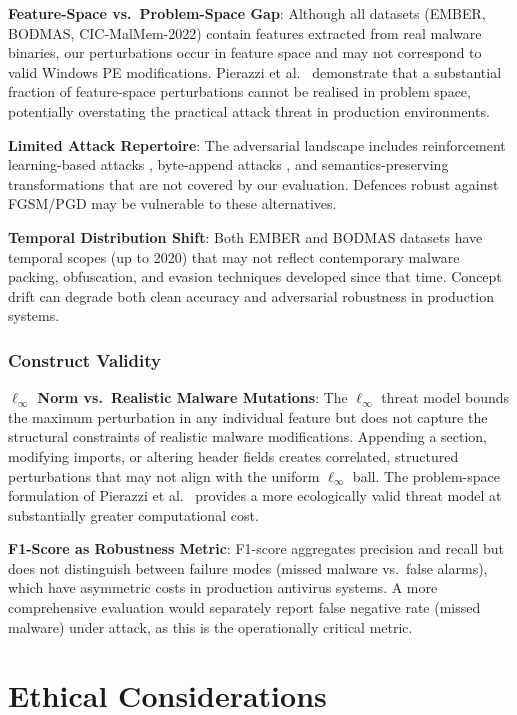\documentclass[conference]{IEEEtran}
\begin{document}
\textbf{Feature-Space vs.\ Problem-Space Gap}: Although all datasets (EMBER, BODMAS, CIC-MalMem-2022) contain features extracted from real malware binaries, our perturbations occur in feature space and may not correspond to valid Windows PE modifications. Pierazzi et al.\ \cite{pierazzi2020} demonstrate that a substantial fraction of feature-space perturbations cannot be realised in problem space, potentially overstating the practical attack threat in production environments.

\textbf{Limited Attack Repertoire}: The adversarial landscape includes reinforcement learning-based attacks \cite{anderson2018}, byte-append attacks \cite{raff2020}, and semantics-preserving transformations that are not covered by our evaluation. Defences robust against FGSM/PGD may be vulnerable to these alternatives.

\textbf{Temporal Distribution Shift}: Both EMBER and BODMAS datasets have temporal scopes (up to 2020) that may not reflect contemporary malware packing, obfuscation, and evasion techniques developed since that time. Concept drift can degrade both clean accuracy and adversarial robustness in production systems.

\subsubsection{Construct Validity}

\textbf{$\ell_\infty$ Norm vs.\ Realistic Malware Mutations}: The $\ell_\infty$ threat model bounds the maximum perturbation in any individual feature but does not capture the structural constraints of realistic malware modifications. Appending a section, modifying imports, or altering header fields creates correlated, structured perturbations that may not align with the uniform $\ell_\infty$ ball. The problem-space formulation of Pierazzi et al.\ \cite{pierazzi2020} provides a more ecologically valid threat model at substantially greater computational cost.

\textbf{F1-Score as Robustness Metric}: F1-score aggregates precision and recall but does not distinguish between failure modes (missed malware vs.\ false alarms), which have asymmetric costs in production antivirus systems. A more comprehensive evaluation would separately report false negative rate (missed malware) under attack, as this is the operationally critical metric.

\section{Ethical Considerations}
\label{sec:ethics}
\end{document}
